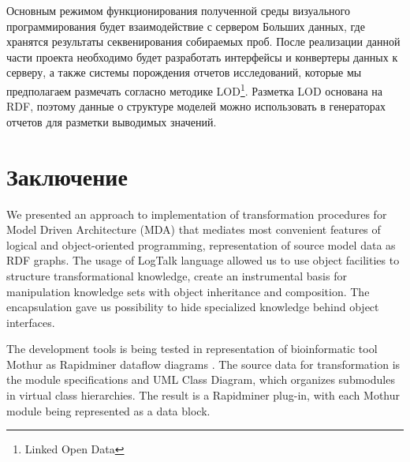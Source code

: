 \documentclass[conference]{IEEEtran} \IEEEoverridecommandlockouts
\begin{document}
Основным режимом функционирования полученной среды визуального программирования будет взаимодействие с сервером Больших данных, где хранятся результаты секвенирования собираемых проб.  После реализации данной части проекта необходимо будет разработать интерфейсы и конвертеры данных к серверу, а также системы порождения отчетов исследований, которые мы предполагаем размечать согласно методике LOD\footnote{Linked Open Data}. Разметка LOD основана на RDF, поэтому данные о структуре моделей можно использовать в генераторах отчетов для разметки выводимых значений. 

\section{Заключение} 

We presented an approach to implementation of transformation procedures for Model Driven Architecture (MDA) that mediates most convenient features of logical and object-oriented programming, representation of source model data as RDF graphs. The usage of LogTalk language allowed us to use object facilities to structure transformational knowledge, create an instrumental basis for manipulation knowledge sets with object inheritance and composition. The encapsulation gave us possibility to hide specialized knowledge behind object interfaces. 

The development tools is being tested in representation of bioinformatic tool Mothur as Rapidminer dataflow diagrams \cite{bit2019}. The source data for transformation is the module specifications and UML Class Diagram, which organizes submodules in virtual class hierarchies. The result is a Rapidminer plug-in, with each Mothur module being represented as a data block. 
\end{document}
